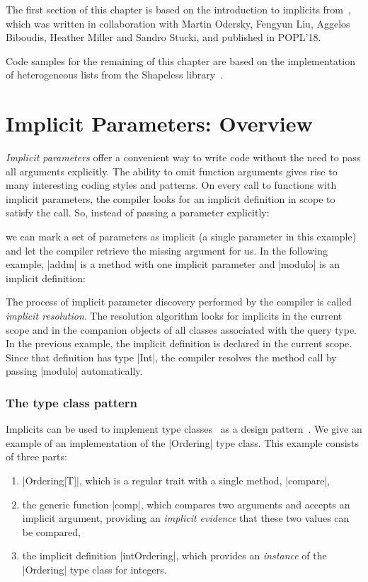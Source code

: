 The first section of this chapter is based on the introduction to implicits from~\citep{odersky2018simplicitly}, which was written in collaboration with Martin Odersky, Fengyun Liu, Aggelos Biboudis, Heather Miller and Sandro Stucki, and published in POPL'18.

Code samples for the remaining of this chapter are based on the implementation of heterogeneous lists from the Shapeless library~\citep{sabin2011shapeless}.

\section{Implicit Parameters: Overview}

\emph{Implicit parameters} offer a convenient way to write code without the need to pass all arguments explicitly.
The ability to omit function arguments gives rise to many interesting coding styles and patterns.
On every call to functions with implicit parameters, the compiler looks for an implicit definition in scope to satisfy the call.
So, instead of passing a parameter explicitly:

\explicitModulo

\noindent
we can mark a set of parameters as implicit (a single parameter in this example) and let the compiler retrieve the missing argument for us.
In the following example, |addm| is a method with one implicit parameter and |modulo| is an implicit definition:

\implicitModulo

The process of implicit parameter discovery performed by the compiler is called \emph{implicit resolution}.
The resolution algorithm looks for implicits in the current scope and in the companion objects of all classes associated with the query type.
In the previous example, the implicit definition is declared in the current scope.
Since that definition has type |Int|, the compiler resolves the method call by passing |modulo| automatically.

\subsubsection{The type class pattern}

Implicits can be used to implement type classes~\citep{wadler1989how} as a design pattern~\citep{oliveira2010type}.
We give an example of an implementation of the |Ordering| type class.
This example consists of three parts:

\begin{enumerate}
  \item |Ordering[T]|, which is a regular trait with a single method, |compare|,
  \item the generic function |comp|, which compares two arguments and accepts an implicit argument, providing an \emph{implicit evidence} that these two values can be compared,
  \item the implicit definition |intOrdering|, which provides an \emph{instance} of the |Ordering| type class for integers.
\end{enumerate}

